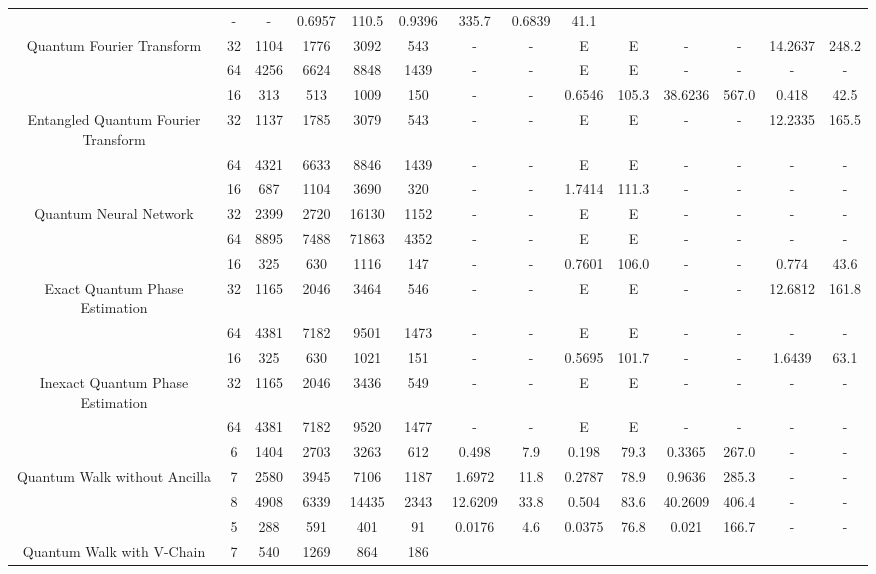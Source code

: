 \begin{table}[htb]
{\begin{tabular}{|c|c|c|c|c|c|c|c|c|c|c|c|c|c|}
 & - & -
 & 0.6957 & 110.5
 & 0.9396 & 335.7
 & 0.6839 & 41.1
 \\
Quantum Fourier Transform & 
32 & 1104 & 1776 & 3092 & 543
 & - & -
 & E & E
 & - & -
 & 14.2637 & 248.2
 \\
 & 
64 & 4256 & 6624 & 8848 & 1439
 & - & -
 & E & E
 & - & -
 & - & -
 \\
\hline
 & 
16 & 313 & 513 & 1009 & 150
 & - & -
 & 0.6546 & 105.3
 & 38.6236 & 567.0
 & 0.418 & 42.5
 \\
Entangled Quantum Fourier Transform & 
32 & 1137 & 1785 & 3079 & 543
 & - & -
 & E & E
 & - & -
 & 12.2335 & 165.5
 \\
 & 
64 & 4321 & 6633 & 8846 & 1439
 & - & -
 & E & E
 & - & -
 & - & -
 \\
\hline
 & 
16 & 687 & 1104 & 3690 & 320
 & - & -
 & 1.7414 & 111.3
 & - & -
 & - & -
 \\
Quantum Neural Network & 
32 & 2399 & 2720 & 16130 & 1152
 & - & -
 & E & E
 & - & -
 & - & -
 \\
 & 
64 & 8895 & 7488 & 71863 & 4352
 & - & -
 & E & E
 & - & -
 & - & -
 \\
\hline
 & 
16 & 325 & 630 & 1116 & 147
 & - & -
 & 0.7601 & 106.0
 & - & -
 & 0.774 & 43.6
 \\
Exact Quantum Phase Estimation & 
32 & 1165 & 2046 & 3464 & 546
 & - & -
 & E & E
 & - & -
 & 12.6812 & 161.8
 \\
 & 
64 & 4381 & 7182 & 9501 & 1473
 & - & -
 & E & E
 & - & -
 & - & -
 \\
\hline
 & 
16 & 325 & 630 & 1021 & 151
 & - & -
 & 0.5695 & 101.7
 & - & -
 & 1.6439 & 63.1
 \\
Inexact Quantum Phase Estimation & 
32 & 1165 & 2046 & 3436 & 549
 & - & -
 & E & E
 & - & -
 & - & -
 \\
 & 
64 & 4381 & 7182 & 9520 & 1477
 & - & -
 & E & E
 & - & -
 & - & -
 \\
\hline
 & 
6 & 1404 & 2703 & 3263 & 612
 & 0.498 & 7.9
 & 0.198 & 79.3
 & 0.3365 & 267.0
 & - & -
 \\
Quantum Walk without Ancilla & 
7 & 2580 & 3945 & 7106 & 1187
 & 1.6972 & 11.8
 & 0.2787 & 78.9
 & 0.9636 & 285.3
 & - & -
 \\
 & 
8 & 4908 & 6339 & 14435 & 2343
 & 12.6209 & 33.8
 & 0.504 & 83.6
 & 40.2609 & 406.4
 & - & -
 \\
\hline
 & 
5 & 288 & 591 & 401 & 91
 & 0.0176 & 4.6
 & 0.0375 & 76.8
 & 0.021 & 166.7
 & - & -
 \\
Quantum Walk with V-Chain & 
7 & 540 & 1269 & 864 & 186

\end{tabular}}
\end{table}
